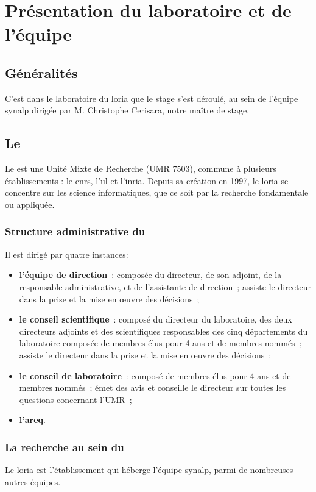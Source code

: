 \chapter{Présentation du laboratoire et de l'équipe}
\section{Généralités}
C'est dans le laboratoire du \gls{loria} que le stage s'est déroulé, au sein de l'équipe \gls{synalp} dirigée par M. Christophe Cerisara, notre maître de stage.

\section{Le }
Le  est une Unité Mixte de Recherche (UMR 7503), commune à plusieurs établissements : le \gls{cnrs}, l’\gls{ul} et l'\gls{inria}.
Depuis sa création en 1997, le \gls{loria} se concentre sur les science informatiques, que ce soit par la recherche fondamentale ou appliquée.

\subsection*{Structure administrative du }
Il est dirigé par quatre instances\autocite{organisation_loria}:
\begin{itemize}
	\item \textbf{l'équipe de direction}~: composée du directeur, de son adjoint, de la responsable administrative, et de l'assistante de direction~; assiste le directeur dans la prise et la mise en œuvre des décisions~;
	\item \textbf{le conseil scientifique}~: composé du directeur du laboratoire, des deux directeurs adjoints et des scientifiques responsables des cinq départements du laboratoire composée de membres élus pour 4 ans et de membres nommés~; assiste le directeur dans la prise et la mise en œuvre des décisions~;
	\item \textbf{le conseil de laboratoire}~: composé de membres élus pour 4 ans et de membres nommés~; émet des avis et conseille le directeur sur toutes les questions concernant l’UMR~;
	\item \textbf{l'\gls{areq}}.
\end{itemize}

\subsection*{La recherche au sein du }
Le \gls{loria} est l'établissement qui héberge l'équipe \gls{synalp}, parmi de nombreuses autres équipes.

